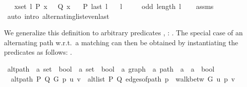 \begin{isabellebody}
\ \ \ {\isachardoublequoteopen}{\isasymforall}x{\isasymin}set\ l{\isachardot}{\kern0pt}\ P\ x\ {\isasymlongleftrightarrow}\ {\isasymnot}\ Q\ x{\isachardoublequoteclose}\isanewline
\ \ \ {\isachardoublequoteopen}P\ {\isacharparenleft}{\kern0pt}last\ l{\isacharparenright}{\kern0pt}{\isachardoublequoteclose}\isanewline
\ \ \ {\isachardoublequoteopen}l\ {\isasymnoteq}\ {\isacharbrackleft}{\kern0pt}{\isacharbrackright}{\kern0pt}{\isachardoublequoteclose}\isanewline
\ \ \ {\isachardoublequoteopen}odd\ {\isacharparenleft}{\kern0pt}length\ l{\isacharparenright}{\kern0pt}{\isachardoublequoteclose}%
\endisataginvisible
{\isafoldinvisible}%
%
\isadeliminvisible
\isanewline
%
\endisadeliminvisible
%
\isadelimproof
\ \ %
\endisadelimproof
%
\isatagproof
{}\isamarkupfalse%
\ assms\isanewline
\ \ \isamarkupfalse%
\ {\isacharparenleft}{\kern0pt}auto\ intro{\isacharcolon}{\kern0pt}\ alternating{\isacharunderscore}{\kern0pt}list{\isacharunderscore}{\kern0pt}even{\isacharunderscore}{\kern0pt}last{\isacharparenright}{\kern0pt}%
\endisatagproof
{\isafoldproof}%
%
\isadelimproof
%
\endisadelimproof
%
\begin{isamarkuptext}%
We generalize this definition to arbitrary predicates , : . The
special case of an alternating path w.r.t.\ a matching  can then be obtained by
instantiating the predicates as follows: .%
\end{isamarkuptext}\isamarkuptrue%
\isamarkupfalse%
\ alt{\isacharunderscore}{\kern0pt}path\ {\isacharcolon}{\kern0pt}{\isacharcolon}{\kern0pt}\ {\isachardoublequoteopen}{\isacharparenleft}{\kern0pt}{\isacharprime}{\kern0pt}a\ set\ {\isasymRightarrow}\ bool{\isacharparenright}{\kern0pt}\ {\isasymRightarrow}\ {\isacharparenleft}{\kern0pt}{\isacharprime}{\kern0pt}a\ set\ {\isasymRightarrow}\ bool{\isacharparenright}{\kern0pt}\ {\isasymRightarrow}\ {\isacharprime}{\kern0pt}a\ graph\ {\isasymRightarrow}\ {\isacharprime}{\kern0pt}a\ path\ {\isasymRightarrow}\ {\isacharprime}{\kern0pt}a\ {\isasymRightarrow}\ {\isacharprime}{\kern0pt}a\ {\isasymRightarrow}\ bool{\isachardoublequoteclose}\ \isanewline
\ \ {\isachardoublequoteopen}alt{\isacharunderscore}{\kern0pt}path\ P\ Q\ G\ p\ u\ v\ {\isasymequiv}\ alt{\isacharunderscore}{\kern0pt}list\ P\ Q\ {\isacharparenleft}{\kern0pt}edges{\isacharunderscore}{\kern0pt}of{\isacharunderscore}{\kern0pt}path\ p{\isacharparenright}{\kern0pt}\ {\isasymand}\ walk{\isacharunderscore}{\kern0pt}betw\ G\ u\ p\ v{\isachardoublequoteclose}\isanewline

\end{isabellebody}
